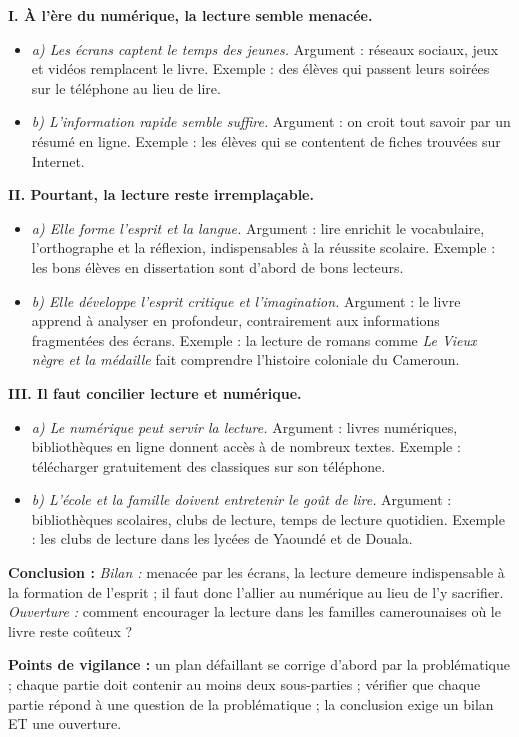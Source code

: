 \documentclass[11pt]{article}
\begin{document}
\begin{corrige}
\begin{enumerate}
\textbf{I. À l'ère du numérique, la lecture semble menacée.}
\begin{itemize}
\item \emph{a) Les écrans captent le temps des jeunes.} Argument : réseaux sociaux, jeux et vidéos remplacent le livre. Exemple : des élèves qui passent leurs soirées sur le téléphone au lieu de lire.
\item \emph{b) L'information rapide semble suffire.} Argument : on croit tout savoir par un résumé en ligne. Exemple : les élèves qui se contentent de fiches trouvées sur Internet.
\end{itemize}

\textbf{II. Pourtant, la lecture reste irremplaçable.}
\begin{itemize}
\item \emph{a) Elle forme l'esprit et la langue.} Argument : lire enrichit le vocabulaire, l'orthographe et la réflexion, indispensables à la réussite scolaire. Exemple : les bons élèves en dissertation sont d'abord de bons lecteurs.
\item \emph{b) Elle développe l'esprit critique et l'imagination.} Argument : le livre apprend à analyser en profondeur, contrairement aux informations fragmentées des écrans. Exemple : la lecture de romans comme \emph{Le Vieux nègre et la médaille} fait comprendre l'histoire coloniale du Cameroun.
\end{itemize}

\textbf{III. Il faut concilier lecture et numérique.}
\begin{itemize}
\item \emph{a) Le numérique peut servir la lecture.} Argument : livres numériques, bibliothèques en ligne donnent accès à de nombreux textes. Exemple : télécharger gratuitement des classiques sur son téléphone.
\item \emph{b) L'école et la famille doivent entretenir le goût de lire.} Argument : bibliothèques scolaires, clubs de lecture, temps de lecture quotidien. Exemple : les clubs de lecture dans les lycées de Yaoundé et de Douala.
\end{itemize}

\textbf{Conclusion :} \emph{Bilan :} menacée par les écrans, la lecture demeure indispensable à la formation de l'esprit ; il faut donc l'allier au numérique au lieu de l'y sacrifier. \emph{Ouverture :} comment encourager la lecture dans les familles camerounaises où le livre reste coûteux ?
\end{enumerate}

\textbf{Points de vigilance :} un plan défaillant se corrige d'abord par la problématique ; chaque partie doit contenir au moins deux sous-parties ; vérifier que chaque partie répond à une question de la problématique ; la conclusion exige un bilan ET une ouverture.
\end{corrige}
\end{document}
